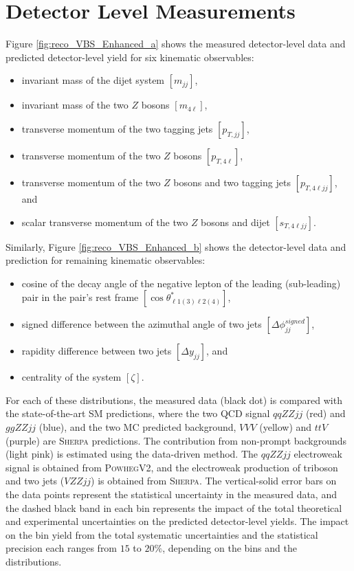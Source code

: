 \section{ Detector Level Measurements }
\label{sec:DetectorLevel_Measurement}

Figure \ref{fig:reco_VBS_Enhanced_a} shows the measured detector-level data and predicted detector-level yield for six kinematic observables:
\begin{itemize}
    \item{ invariant mass of the dijet system $[m_{jj}]$},
    \item{ invariant mass of the two $Z$ bosons $[m_{4\ell}]$},
    \item{ transverse momentum of the two tagging jets $[p_{T,jj}]$},
    \item{ transverse momentum of the two $Z$ bosons $[p_{T,4\ell}]$},
    \item{ transverse momentum of the two $Z$ bosons and two tagging jets $[p_{T,4\ell jj}]$}, and 
    \item{ scalar transverse momentum of the two $Z$ bosons and dijet $[s_{T,4\ell jj}]$}.
\end{itemize}
Similarly, Figure \ref{fig:reco_VBS_Enhanced_b} shows the detector-level data and prediction for remaining kinematic observables:
\begin{itemize}
\item{ cosine of the decay angle of the negative lepton of the leading (sub-leading) pair in the pair's rest frame $[\cos \theta^{*}_{\ell 1 (3) \ell 2 (4)}]$},
\item{ signed difference between the azimuthal angle of two jets $[\Delta \phi _{jj}^{signed}]$},
\item{ rapidity difference between two jets $[\Delta y_{jj}]$}, and 
\item{ centrality of the system $[\zeta]$}.
\end{itemize}
For each of these distributions, the measured data (black dot) is compared with the state-of-the-art SM predictions, where the two QCD signal $qqZZjj$ (red) and $ggZZjj$ (blue), and the two MC predicted background, $VVV$ (yellow) and $ttV$ (purple) are \textsc{Sherpa} predictions. The contribution from non-prompt backgrounds (light pink) is estimated using the data-driven method. The $qqZZjj$ electroweak signal is obtained from \textsc{PowhegV2}, and the electroweak production of triboson and two jets ($VZZjj$) is obtained from \textsc{Sherpa}. The vertical-solid error bars on the data points represent the statistical uncertainty in the measured data, and the dashed black band in each bin represents the impact of the total theoretical and experimental uncertainties on the predicted detector-level yields. The impact on the bin yield from the total systematic uncertainties and the statistical precision each ranges from $15$ to $20\%$, depending on the bins and the distributions. 

